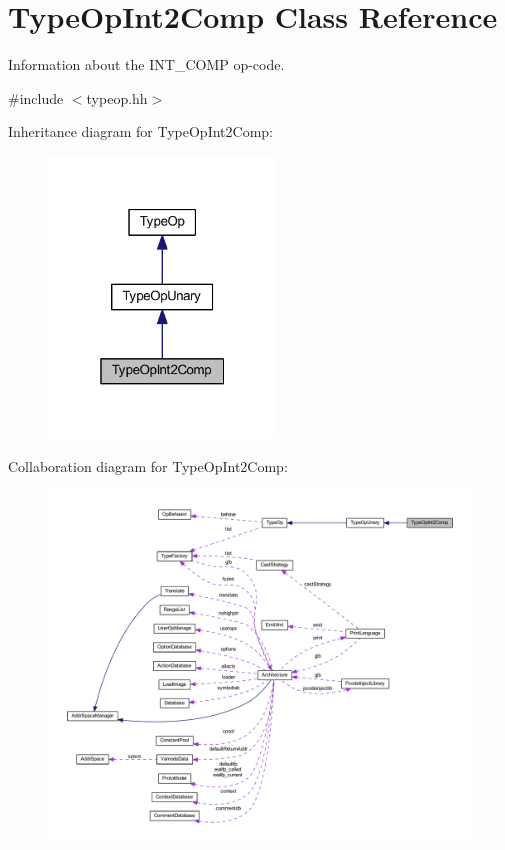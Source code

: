 \hypertarget{class_type_op_int2_comp}{}\section{Type\+Op\+Int2\+Comp Class Reference}
\label{class_type_op_int2_comp}


Information about the I\+N\+T\+\_\+C\+O\+MP op-\/code.  




{\ttfamily \#include $<$typeop.\+hh$>$}



Inheritance diagram for Type\+Op\+Int2\+Comp\+:
\nopagebreak
\begin{figure}[H]
\begin{center}
\leavevmode
\includegraphics[width=172pt]{class_type_op_int2_comp__inherit__graph}
\end{center}
\end{figure}


Collaboration diagram for Type\+Op\+Int2\+Comp\+:
\nopagebreak
\begin{figure}[H]
\begin{center}
\leavevmode
\includegraphics[width=350pt]{class_type_op_int2_comp__coll__graph}
\end{center}
\end{figure}

